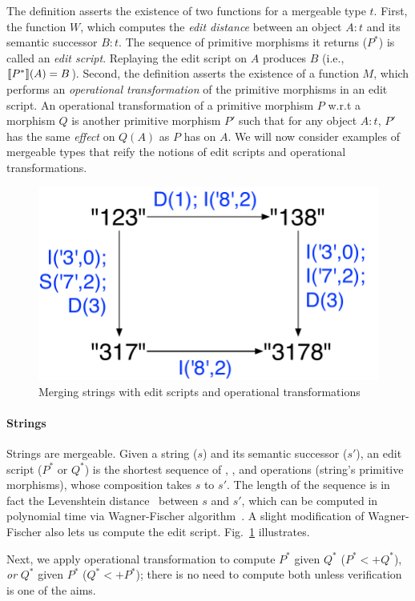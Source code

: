 The definition asserts the existence of two functions for a mergeable
type $t$. First, the function $W$, which computes the \emph{edit
distance} between an object $A:t$ and its semantic successor $B:t$.
The sequence of primitive morphisms it returns ($P^*$) is called an
\emph{edit script}. Replaying the edit script on $A$ produces $B$
(i.e., $\llbracket P^* \rrbracket(A) = B$). Second, the definition asserts the
existence of a function $M$, which performs an \emph{operational
transformation} of the primitive morphisms in an edit script. An
operational transformation of a primitive morphism $P$ w.r.t a
morphism $Q$ is another primitive morphism $P'$ such that for any
object $A:t$, $P'$ has the same \emph{effect} on $Q(A)$ as $P$ has on
$A$. We will now consider examples of mergeable types that reify the
notions of edit scripts and operational transformations.

\begin{figure}
\centering
\includegraphics[scale=0.4]{Figures/string-eg}

\caption{Merging strings with edit scripts and operational
transformations}
\label{fig:string-eg}
\end{figure}


\paragraph{Strings} Strings are mergeable. Given a string ($s$) and
its semantic successor ($s'$), an edit script ($P^*$ or $Q^*$) is the
shortest sequence of , , and 
operations (string's primitive morphisms), whose composition takes $s$
to $s'$. The length of the sequence is in fact the Levenshtein
distance~\cite{levenstein} between $s$ and $s'$, which can be computed
in polynomial time via Wagner-Fischer algorithm~\cite{wagner-fischer}.
A slight modification of Wagner-Fischer also lets us compute the edit
script. Fig.~\ref{fig:string-eg} illustrates.

Next, we apply operational transformation to compute $P^*$ given $Q^*$
($P^* <+ Q^*$), \emph{or} $Q^*$ given $P^*$ ($Q^* <+ P^*$); there is
no need to compute both unless verification is one of the aims. 


\paragraph{}



